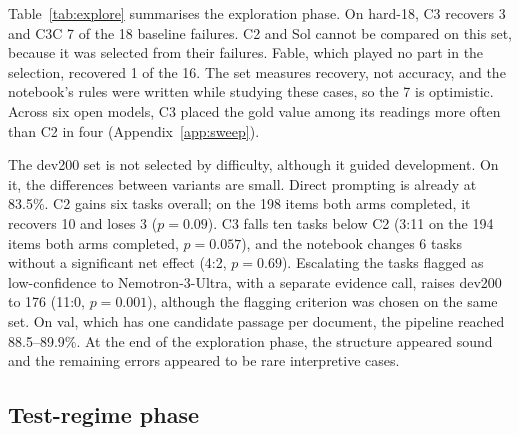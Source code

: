 \documentclass[11pt]{article}%
\begin{document}
Table~\ref{tab:explore} summarises the exploration phase. On hard-18,
\textsc{C3} recovers 3 and \textsc{C3C} 7 of the 18 baseline failures.
\textsc{C2} and Sol cannot be compared on this set, because it was selected
from their failures. Fable, which played no part in the selection, recovered 1
of the 16. The set measures recovery, not accuracy, and the notebook's rules
were written while studying these cases, so the 7 is optimistic. Across six
open models, \textsc{C3} placed the gold value among its readings more often
than \textsc{C2} in four (Appendix~\ref{app:sweep}).

The dev200 set is not selected by difficulty, although it guided development.
On it, the differences between variants are small. Direct prompting is already at
83.5\%. \textsc{C2} gains six tasks overall; on the 198 items both arms
completed, it recovers 10 and loses 3 ($p=0.09$). \textsc{C3} falls ten tasks
below \textsc{C2} (3:11 on the 194 items both arms completed, $p=0.057$), and the notebook changes
6 tasks without a significant net effect (4:2, $p=0.69$). Escalating the tasks
flagged as low-confidence to Nemotron-3-Ultra, with a separate evidence call,
raises dev200 to 176 (11:0, $p=0.001$), although the flagging criterion was
chosen on the same set. On val, which has
one candidate passage per document, the pipeline reached 88.5--89.9\%. At the
end of the exploration phase, the structure appeared sound and the remaining
errors appeared to be rare interpretive cases.

\subsection{Test-regime phase}
\end{document}
